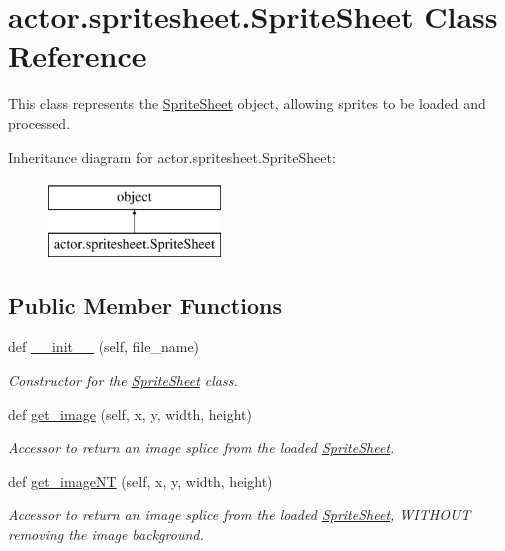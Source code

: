 \hypertarget{classactor_1_1spritesheet_1_1_sprite_sheet}{}\section{actor.\+spritesheet.\+Sprite\+Sheet Class Reference}
\label{classactor_1_1spritesheet_1_1_sprite_sheet}


This class represents the \hyperlink{classactor_1_1spritesheet_1_1_sprite_sheet}{Sprite\+Sheet} object, allowing sprites to be loaded and processed.  


Inheritance diagram for actor.\+spritesheet.\+Sprite\+Sheet\+:\begin{figure}[H]
\begin{center}
\leavevmode
\includegraphics[height=2.000000cm]{classactor_1_1spritesheet_1_1_sprite_sheet}
\end{center}
\end{figure}
\subsection*{Public Member Functions}
\begin{DoxyCompactItemize}
\item 
def \hyperlink{classactor_1_1spritesheet_1_1_sprite_sheet_a00df0cb80c019436add7a699a83c5ae2}{\+\_\+\+\_\+init\+\_\+\+\_\+} (self, file\+\_\+name)
\begin{DoxyCompactList}\small\item\em Constructor for the \hyperlink{classactor_1_1spritesheet_1_1_sprite_sheet}{Sprite\+Sheet} class. \end{DoxyCompactList}\item 
def \hyperlink{classactor_1_1spritesheet_1_1_sprite_sheet_ad2c4f5b00c63a9377b64fe28ef26587b}{get\+\_\+image} (self, x, y, width, height)
\begin{DoxyCompactList}\small\item\em Accessor to return an image splice from the loaded \hyperlink{classactor_1_1spritesheet_1_1_sprite_sheet}{Sprite\+Sheet}. \end{DoxyCompactList}\item 
def \hyperlink{classactor_1_1spritesheet_1_1_sprite_sheet_a2d0883c80dad8344520f40f6fd2b79a6}{get\+\_\+image\+NT} (self, x, y, width, height)
\begin{DoxyCompactList}\small\item\em Accessor to return an image splice from the loaded \hyperlink{classactor_1_1spritesheet_1_1_sprite_sheet}{Sprite\+Sheet}, W\+I\+T\+H\+O\+UT removing the image background. \end{DoxyCompactList}\end{DoxyCompactItemize}
